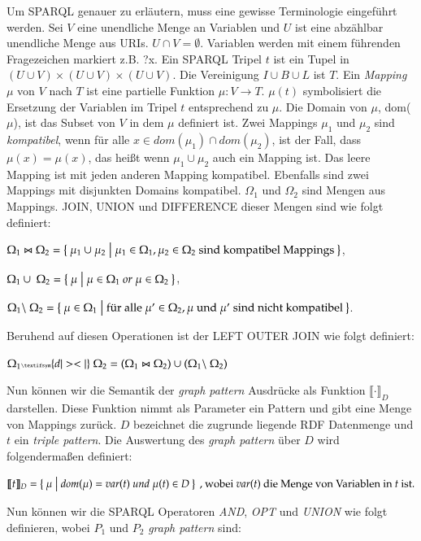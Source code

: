 \documentclass[draft,final]{vutinfth} %
\begin{document}
Um SPARQL genauer zu erläutern, muss eine gewisse Terminologie eingeführt werden. Sei $V$ eine unendliche Menge an Variablen und $U$ ist eine abzählbar unendliche Menge aus URIs. $U \cap V = \emptyset$. Variablen werden mit einem führenden Fragezeichen markiert z.B. ?x. Ein SPARQL Tripel $t$ ist ein Tupel in $(U \cup V) \times (U \cup V) \times (U \cup V)$. Die Vereinigung $I \cup B \cup L$ ist $T$. Ein \textit{Mapping} $\mu$ von $V$ nach $T$ ist eine partielle Funktion $\mu : V \rightarrow T$. $\mu (t)$ symbolisiert die Ersetzung der Variablen im Tripel $t$ entsprechend zu $\mu$. Die Domain von $\mu$, dom($\mu$), ist das Subset von $V$ in dem $\mu$ definiert ist. Zwei Mappings $\mu_1$ und $\mu_2$ sind \textit{kompatibel}, wenn für alle $x \in dom(\mu_1) \cap dom(\mu_2)$, ist der Fall, dass $\mu(x) = \mu(x)$, das hei\ss t wenn $\mu_1 \cup \mu_2$ auch ein Mapping ist. Das leere Mapping ist mit jeden anderen Mapping kompatibel. Ebenfalls sind zwei Mappings mit disjunkten Domains kompatibel. $\Omega_1$ und $\Omega_2$ sind Mengen aus Mappings. JOIN, UNION und DIFFERENCE dieser Mengen sind wie folgt definiert:

 $\Omega_1 \Join \Omega_2 = \Set{ \mu_1 \cup \mu_2 | \mu_1 \in \Omega_1, \mu_2 \in \Omega_2 \ \text{sind kompatibel Mappings} }$,

 $\Omega_1 \cup \ \Omega_2 = \Set{ \mu | \mu \in \Omega_1 \ or \ \mu \in \Omega_2 }$,

 $\Omega_1 \backslash \ \Omega_2 = \Set{ \mu \in \Omega_1 | \text{für alle} \ \mu' \in \Omega_2, \mu \ \text{und} \ \mu' \ \text{sind nicht kompatibel} }$.

Beruhend auf diesen Operationen ist der LEFT OUTER JOIN wie folgt definiert:

$\Omega_1 {\tiny \textifsym{d|><|}} \ \Omega_2 = (\Omega_1 \Join \Omega_2) \cup (\Omega_1 \backslash \ \Omega_2)$


Nun können wir die Semantik der \textit{graph pattern} Ausdrücke als Funktion $\llbracket \cdot \rrbracket_D$ darstellen. Diese Funktion nimmt als Parameter ein Pattern und gibt eine Menge von Mappings zurück. $D$ bezeichnet die zugrunde liegende RDF Datenmenge und $t$ ein \textit{triple pattern}. Die Auswertung des \textit{graph pattern} über $D$ wird folgenderma\ss en definiert:

$\llbracket t \rrbracket_D = \Set{ \mu | dom(\mu) = var(t) \ und \ \mu(t) \in D } \ \text{, wobei} \ var(t) \ \text{die Menge von Variablen in} \ t \ \text{ist.}$ 

Nun können wir die SPARQL Operatoren \textit{AND}, \textit{OPT} und \textit{UNION} wie folgt definieren, wobei $P_1$ und $P_2$ \textit{graph pattern} sind:
\end{document}
